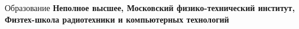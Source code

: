 
\begin{rubric}{Образование}
\entry*[2023--2026 ]%
	\textbf{Неполное высшее, Московский физико-технический институт, Физтех-школа радиотехники и компьютерных технологий}

\end{rubric}